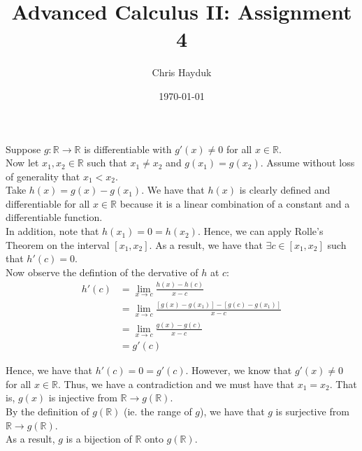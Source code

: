 \documentclass[12pt]{article}
\newenvironment{problem}[2][Problem]{\begin{trivlist}
\item[\hskip \labelsep {\bfseries #1}\hskip \labelsep {\bfseries #2.}]}{\end{trivlist}}
\begin{document}
\title{Advanced Calculus II: Assignment 4}

\author{Chris Hayduk}
\date{\today}

\maketitle

\begin{problem}{1}
\end{problem}

Suppose $g: \mathbb{R} \to \mathbb{R}$ is differentiable with $g'(x) \neq 0$ for all $x \in \mathbb{R}$.\\

Now let $x_1, x_2 \in \mathbb{R}$ such that $x_1 \neq x_2$ and $g(x_1) = g(x_2)$. Assume without loss of generality that $x_1 < x_2$.\\

Take $h(x) = g(x) - g(x_1)$. We have that $h(x)$ is clearly defined and differentiable for all $x \in \mathbb{R}$ because it is a linear combination of a constant and a differentiable function.\\

In addition, note that $h(x_1) = 0 = h(x_2)$. Hence, we can apply Rolle's Theorem on the interval $[x_1, x_2]$. As a result, we have that $\exists c \in [x_1, x_2]$ such that $h'(c) = 0$.\\

Now observe the defintion of the dervative of $h$ at $c$:
\begin{align*}
h'(c) &= \lim_{x \to c} \frac{h(x) - h(c)}{x - c}\\
&= \lim_{x \to c} \frac{[g(x) - g(x_1)] - [g(c) - g(x_1)]}{x - c}\\
&= \lim_{x \to c} \frac{g(x) - g(c)}{x - c}\\
&= g'(c)
\end{align*}

Hence, we have that $h'(c) = 0 = g'(c)$. However, we know that $g'(x) \neq 0$ for all $x \in \mathbb{R}$. Thus, we have a contradiction and we must have that $x_1 = x_2$. That is, $g(x)$ is injective from $\mathbb{R} \to g(\mathbb{R})$.\\

By the definition of $g(\mathbb{R})$ (ie. the range of $g$), we have that $g$ is surjective from $\mathbb{R} \to g(\mathbb{R})$.\\

As a result, $g$ is a bijection of $\mathbb{R}$ onto $g(\mathbb{R})$.
\end{document}
